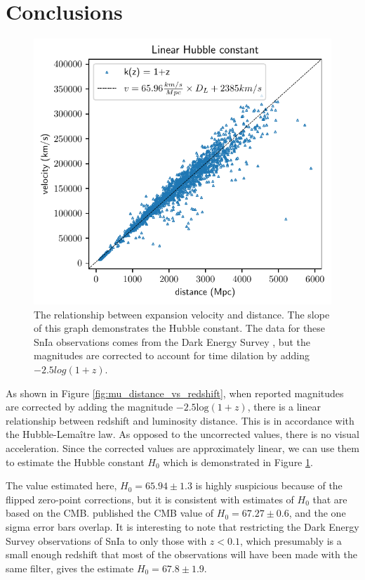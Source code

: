 \documentclass[aps,prl,reprint,amsmath]{revtex4-2}
\begin{document}
\section{Conclusions}
\label{sec:conclusions}

\begin{figure}
  \includegraphics[width=\columnwidth]{velocity_vs_distance.pdf}
  \caption{The relationship between expansion velocity and distance. The slope
  of this graph demonstrates the Hubble constant. The data for these SnIa
  observations comes from the Dark Energy Survey \citep{vincenzi2024}, but the
  magnitudes are corrected to account for time dilation by adding
  $-2.5 log(1 + z)$.
  }
\label{fig:expansion}
\end{figure}

As shown in Figure \ref{fig:mu_distance_vs_redshift}, when reported magnitudes
are corrected by adding the magnitude $-2.5\text{log}(1+z)$, there is a linear
relationship between redshift and luminosity distance. This is in accordance
with the Hubble-Lema\^{i}tre law. As opposed to the uncorrected values, there
is no visual acceleration. Since the corrected values are approximately linear,
we can use them to estimate the Hubble constant $H_0$ which is demonstrated in
Figure \ref{fig:expansion}.

The value estimated here, $H_0 = 65.94 \pm 1.3$ is highly suspicious
because of the flipped zero-point corrections, but it is consistent with
estimates of $H_0$ that are based on the CMB. \citet{planck2020} published the
CMB value of $H_0 = 67.27 \pm 0.6$, and the one sigma error bars overlap. It
is interesting to note that restricting the Dark Energy Survey observations of
SnIa \citep{vincenzi2024} to only those with $z < 0.1$, which presumably is a
small enough redshift that most of the observations will have been made with
the same filter, gives the estimate $H_0 = 67.8 \pm 1.9$.
\end{document}
